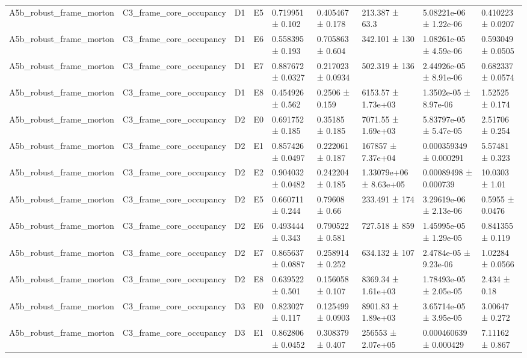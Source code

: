 \begin{table}
\begin{tabular}{lllllllll}
A5b\_robust\_frame\_morton & C3\_frame\_core\_occupancy & D1 & E5 & 0.719951 ± 0.102 & 0.405467 ± 0.178 & 213.387 ± 63.3 & 5.08221e-06 ± 1.22e-06 & 0.410223 ± 0.0207 \\
A5b\_robust\_frame\_morton & C3\_frame\_core\_occupancy & D1 & E6 & 0.558395 ± 0.193 & 0.705863 ± 0.604 & 342.101 ± 130 & 1.08261e-05 ± 4.59e-06 & 0.593049 ± 0.0505 \\
A5b\_robust\_frame\_morton & C3\_frame\_core\_occupancy & D1 & E7 & 0.887672 ± 0.0327 & 0.217023 ± 0.0934 & 502.319 ± 136 & 2.44926e-05 ± 8.91e-06 & 0.682337 ± 0.0574 \\
A5b\_robust\_frame\_morton & C3\_frame\_core\_occupancy & D1 & E8 & 0.454926 ± 0.562 & 0.2506 ± 0.159 & 6153.57 ± 1.73e+03 & 1.3502e-05 ± 8.97e-06 & 1.52525 ± 0.174 \\
A5b\_robust\_frame\_morton & C3\_frame\_core\_occupancy & D2 & E0 & 0.691752 ± 0.185 & 0.35185 ± 0.185 & 7071.55 ± 1.69e+03 & 5.83797e-05 ± 5.47e-05 & 2.51706 ± 0.254 \\
A5b\_robust\_frame\_morton & C3\_frame\_core\_occupancy & D2 & E1 & 0.857426 ± 0.0497 & 0.222061 ± 0.187 & 167857 ± 7.37e+04 & 0.000359349 ± 0.000291 & 5.57481 ± 0.323 \\
A5b\_robust\_frame\_morton & C3\_frame\_core\_occupancy & D2 & E2 & 0.904032 ± 0.0482 & 0.242204 ± 0.185 & 1.33079e+06 ± 8.63e+05 & 0.00089498 ± 0.000739 & 10.0303 ± 1.01 \\
A5b\_robust\_frame\_morton & C3\_frame\_core\_occupancy & D2 & E5 & 0.660711 ± 0.244 & 0.79608 ± 0.66 & 233.491 ± 174 & 3.29619e-06 ± 2.13e-06 & 0.5955 ± 0.0476 \\
A5b\_robust\_frame\_morton & C3\_frame\_core\_occupancy & D2 & E6 & 0.493444 ± 0.343 & 0.790522 ± 0.581 & 727.518 ± 859 & 1.45995e-05 ± 1.29e-05 & 0.841355 ± 0.119 \\
A5b\_robust\_frame\_morton & C3\_frame\_core\_occupancy & D2 & E7 & 0.865637 ± 0.0887 & 0.258914 ± 0.252 & 634.132 ± 107 & 2.4784e-05 ± 9.23e-06 & 1.02284 ± 0.0566 \\
A5b\_robust\_frame\_morton & C3\_frame\_core\_occupancy & D2 & E8 & 0.639522 ± 0.501 & 0.156058 ± 0.107 & 8369.34 ± 1.61e+03 & 1.78493e-05 ± 2.05e-05 & 2.434 ± 0.18 \\
A5b\_robust\_frame\_morton & C3\_frame\_core\_occupancy & D3 & E0 & 0.823027 ± 0.117 & 0.125499 ± 0.0903 & 8901.83 ± 1.89e+03 & 3.65714e-05 ± 3.95e-05 & 3.00647 ± 0.272 \\
A5b\_robust\_frame\_morton & C3\_frame\_core\_occupancy & D3 & E1 & 0.862806 ± 0.0452 & 0.308379 ± 0.407 & 256553 ± 2.07e+05 & 0.000460639 ± 0.000429 & 7.11162 ± 0.867 \\

\end{tabular}
\end{table}
